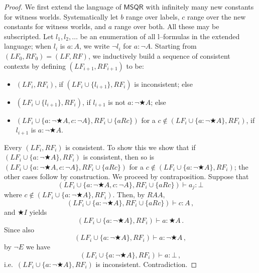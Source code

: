 \documentclass[times, 10pt]{article}
\newcommand{\MSQR}{\textsf{MSQR}}
\newcommand{\RAA}{\mathit{RAA}}
\newcommand{\LF}{\mathit{LF}}
\newcommand{\RF}{\mathit{RF}}
\begin{document}
\begin{proof}
  We first extend the language of $\MSQR$ with infinitely many new
  constants for witness worlds.  Systematically let $b$ range over
  labels, $c$ range over the new constants for witness worlds, and $a$
  range over both.  All these may be subscripted.  Let $l_1,l_2,
  \ldots$ be an enumeration of all l--formulas in the extended language;
  when $l_i$ is $a:A$, we write $\neg l_i$ for $a:\neg A$.  Starting
  from $(\LF_0,\RF_0) = (\LF,\RF)$, we inductively build a
  sequence of consistent contexts by defining
  $(\LF_{i+1},\RF_{i+1})$ to be:
  \begin{itemize}
  \item $(\LF_i,\RF_i)$, if $(\LF_i \cup \{l_{i+1}\},\RF_i)$ is inconsistent; else
  \item $(\LF_i \cup \{l_{i+1}\},\RF_i)$, if $l_{i+1}$ is not
    $a: \neg \bigstar A$; else
  \item $(\LF_i \cup \{a: \neg \bigstar A, c: \neg A\},\RF_i
    \cup\{a R c\})$ for a $c \not\in (\LF_i \cup \{a: \neg \bigstar A\},\RF_i)$, if $l_{i+1}$ is 
    $a: \neg \bigstar A$.
  \end{itemize}
  Every $(\LF_i,\RF_i)$ is consistent.  To show this we show
  that if $(\LF_i \cup \{a: \neg \bigstar A\},\RF_i)$ is
  consistent, then so is $(\LF_i \cup \{a: \neg \bigstar A, c: \neg
  A\},\RF_i \cup\{a R c\})$ for a $c \not\in (\LF_i \cup
  \{a: \neg \bigstar A\},\RF_i)$; the other cases follow by
  construction.  We proceed by contraposition.  Suppose that
  \begin{displaymath}
  (\LF_i \cup \{a: \neg \bigstar A, c: \neg A\},\RF_i \cup \{a R c\}) \vdash a_j:\bot
  \end{displaymath}
  where $c \not\in (\LF_i \cup \{a: \neg \bigstar A\},\RF_i)$.
  Then, by $\RAA$,
  \begin{displaymath}
  (\LF_i \cup \{a: \neg \bigstar A\},\RF_i \cup \{a R c\}) \vdash c: A\,,
  \end{displaymath}
  and $\bigstar I$ yields
  \begin{displaymath}
  (\LF_i \cup \{a: \neg \bigstar A\},\RF_i) \vdash a: \bigstar A\,. 
  \end{displaymath}
  Since also
  \begin{displaymath}
  (\LF_i \cup \{a: \neg \bigstar A\},\RF_i) \vdash a: \neg \bigstar A\,, 
  \end{displaymath}
  by $\neg E$ we have
  \begin{displaymath}
  (\LF_i \cup \{a: \neg \bigstar A\},\RF_i) \vdash a:\bot\,,
  \end{displaymath}
  i.e.~$(\LF_i \cup \{a: \neg \bigstar A\},\RF_i)$ is inconsistent.
  Contradiction.
  

\end{proof}
\end{document}
